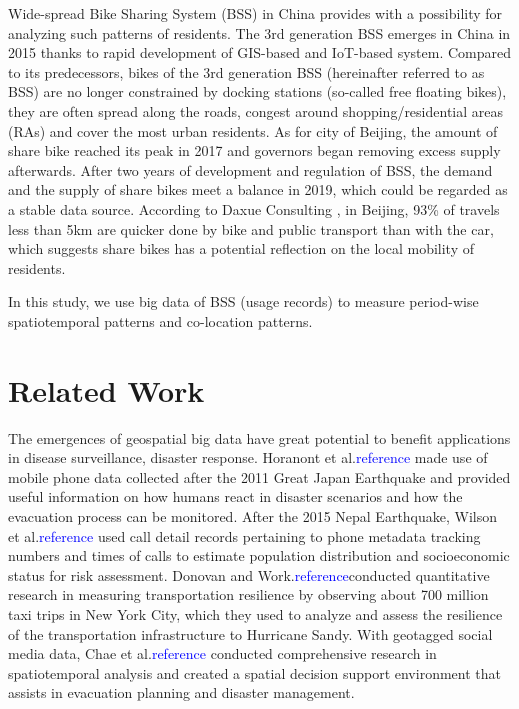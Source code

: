 \documentclass[preprints,ijgi,submit,moreauthors]{Definitions/mdpi}
\begin{document}
Wide-spread Bike Sharing System (BSS) in China provides with a possibility for analyzing such patterns of residents.
The 3rd generation BSS emerges in China in 2015 thanks to rapid development of GIS-based and IoT-based system. 
Compared to its predecessors, bikes of the 3rd generation BSS (hereinafter referred to as BSS) are no longer constrained by docking stations (so-called free floating bikes), they are often spread along the roads, congest around shopping/residential areas (RAs) and cover the most urban residents. 
As for city of Beijing, the amount of share bike reached its peak in 2017 and governors began removing excess supply afterwards. 
After two years of development and regulation of BSS, the demand and the supply of share bikes meet a balance in 2019, which could be regarded as a stable data source.
According to Daxue Consulting \cite{bssmodel}, in Beijing, 93\% of travels less than 5km are quicker done by bike and public transport than with the car, which suggests share bikes has a potential reflection on the local mobility of residents.

In this study, we use big data of BSS (usage records) to measure period-wise spatiotemporal patterns and co-location patterns. 

\section*{Related Work}
The emergences of geospatial big data have great potential to benefit applications in disease surveillance, disaster response. %
Horanont et al.\textcolor{blue}{reference} made use of mobile phone data collected after the 2011 Great Japan Earthquake and provided useful information on how humans react in disaster scenarios and how the evacuation process can be monitored.
After the 2015 Nepal Earthquake, Wilson et al.\textcolor{blue}{reference} used call detail records pertaining to phone metadata tracking numbers and times of calls to estimate population distribution and socioeconomic status for risk assessment.
Donovan and Work.\textcolor{blue}{reference}conducted quantitative research in measuring transportation resilience by observing about 700 million taxi trips in New York City, which they used to analyze and assess the resilience of the transportation infrastructure to Hurricane Sandy.
With geotagged social media data, Chae et al.\textcolor{blue}{reference} conducted comprehensive research in spatiotemporal analysis and created a spatial decision support environment that assists in evacuation planning and disaster management.
\end{document}

